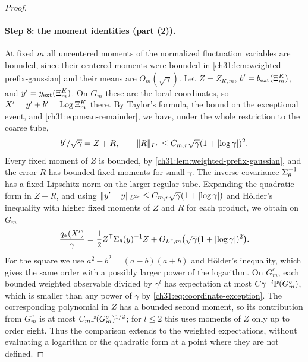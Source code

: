 \begin{proof}
\paragraph{Step 8: the moment identities (part (2)).}
At fixed $m$ all uncentered moments of the normalized fluctuation variables are bounded, since their centered moments were bounded in \cref{ch31:lem:weighted-prefix-gaussian} and their means are $O_m(\sqrt\gamma)$. Let $Z=Z_{K,m}$, $b'=b_{\rm ext}(\Xi_m^K)$, and $y'=y_{\rm ext}(\Xi_m^K)$. On $G_m$ these are the local coordinates, so $X'=y'+b'=\operatorname{Log}\Xi_m^K$ there. By Taylor's formula, the bound on the exceptional event, and \eqref{ch31:eq:mean-remainder}, we have, under the whole restriction to the coarse tube,
\[
 b'/\sqrt\gamma=Z+R,\qquad\lVert R\rVert_{L^r}\le C_{m,r}\sqrt\gamma(1+\lvert \log\gamma\rvert)^2.
\]
Every fixed moment of $Z$ is bounded, by \cref{ch31:lem:weighted-prefix-gaussian}, and the error $R$ has bounded fixed moments for small $\gamma$. The inverse covariance $\Sigma_\theta^{-1}$ has a fixed Lipschitz norm on the larger regular tube. Expanding the quadratic form in $Z+R$, and using $\lVert y'-y\rVert_{L^{2r}}\le C_{m,r}\sqrt\gamma(1+\lvert \log\gamma\rvert)$ and H\"older's inequality with higher fixed moments of $Z$ and $R$ for each product, we obtain on $G_m$
\[
 \frac{q_*(X')}\gamma=\frac12Z^{\mathsf T}\Sigma_\theta(y)^{-1}Z+O_{L^r,m}\bigl(\sqrt\gamma(1+\lvert \log\gamma\rvert)^2\bigr).
\]
For the square we use $a^2-b^2=(a-b)(a+b)$ and H\"older's inequality, which gives the same order with a possibly larger power of the logarithm. On $G_m^c$, each bounded weighted observable divided by $\gamma^l$ has expectation at most $C\gamma^{-l}\mathbb P(G_m^c)$, which is smaller than any power of $\gamma$ by \eqref{ch31:eq:coordinate-exception}. The corresponding polynomial in $Z$ has a bounded second moment, so its contribution from $G_m^c$ is at most $C_m\mathbb P(G_m^c)^{1/2}$; for $l\le2$ this uses moments of $Z$ only up to order eight. Thus the comparison extends to the weighted expectations, without evaluating a logarithm or the quadratic form at a point where they are not defined.


\end{proof}

